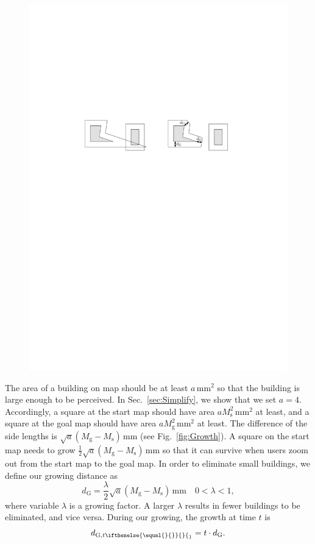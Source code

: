 \documentclass[graybox]{svmult}
\newcommand{\fig}{Fig.~}
\newcommand{\sect}{Sec.~}
\newcommand{\dtrm}[2][]{d_{\mathrm{#2}, t\ifthenelse{\equal{#1}{}}{}{_#1}}}
\begin{document}
\begin{figure}[tb]
	\centering
	\includegraphics{Buffer_MiterLimits}
	\caption{}
	\label{fig:Buffer_MiterLimits}
\end{figure}


The area of a building on map should be at least $a\,\mathrm{mm}^2$ so that the 
building is large enough to be perceived.
In \sect\ref{sec:Simplify}, we show that we set $a=4$.
Accordingly, a square at the start map should have 
area $a M_\mathrm{s}^2\,\mathrm{mm}^2$ at least, and
a square at the goal map should have 
area $a M_\mathrm{g}^2\,\mathrm{mm}^2$ at least.
The difference of the side lengths is 
$\sqrt{a} (M_\mathrm{g}-M_\mathrm{s})\,\mathrm{mm}$ 
 (see \fig\ref{fig:Growth}).
A square on the start map needs to grow $\frac{1}{2}\sqrt{a} 
(M_\mathrm{g}-M_\mathrm{s})\,\mathrm{mm}$ so that 
it can survive when users zoom out from 
the start map to the goal map.
In order to eliminate small buildings, 
we define our growing distance as
\begin{equation}
\label{eq:d_G}
d_\mathrm{G}=\frac{\lambda}{2}\sqrt{a} (M_\mathrm{g}-M_\mathrm{s})\,\mathrm{mm} 
\quad 0 < \lambda <1,
\end{equation}
where variable $\lambda$ is a growing factor. 
A larger $\lambda$ results in  
fewer buildings to be eliminated, and vice versa.
During our growing, the growth at time $t$ is
\begin{equation}
\label{eq:d_Gt}
\dtrm{G} = t \cdot d_\mathrm{G}.
\end{equation}
\end{document}
